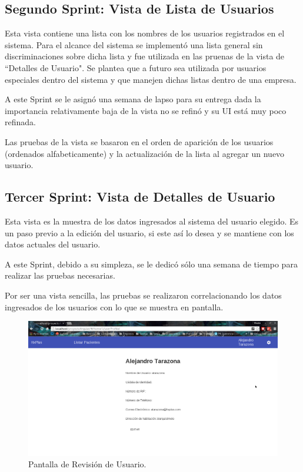     \subsection{Segundo Sprint: Vista de Lista de Usuarios}
    
    Esta vista contiene una lista con los nombres de los usuarios registrados en el sistema. Para el alcance del sistema se implementó una lista general sin discriminaciones sobre dicha lista y fue utilizada en las pruenas de la vista de ``Detalles de Usuario". Se plantea que a futuro sea utilizada por usuarios especiales dentro del sistema y que manejen dichas listas dentro de una empresa.
    
    A este Sprint se le asignó una semana de lapso para su entrega dada la importancia relativamente baja de la vista no se refinó y su UI está muy poco refinada.
    
    Las pruebas de la vista se basaron en el orden de aparición de los usuarios (ordenados alfabeticamente) y la actualización de la lista al agregar un nuevo usuario.
    
    \subsection{Tercer Sprint: Vista de Detalles de Usuario}
    
    Esta vista es la muestra de los datos ingresados al sistema del usuario elegido. Es un paso previo a la edición del usuario, si este así lo desea y se mantiene con los datos actuales del usuario.
    
    A este Sprint, debido a su simpleza, se le dedicó sólo una semana de tiempo para realizar las pruebas necesarias.
    
    Por ser una vista sencilla, las pruebas se realizaron correlacionando los datos ingresados de los usuarios con lo que se muestra en pantalla.
    
    \begin{figure}[htbp!]
        \begin{center}
            \includegraphics[width=.9\textwidth]{figures/p3}
        \end{center}
        \caption{Pantalla de Revisión de Usuario.}
        \label{Revisión}
    \end{figure}
    
